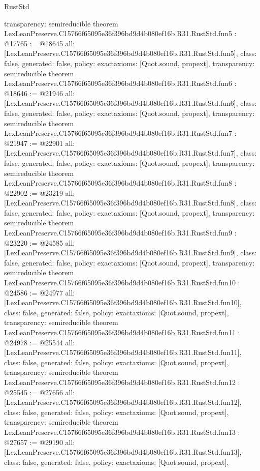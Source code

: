 \begin{lexlean}{RustStd}
\begin{coremodule}
{  transparency: semireducible
}
theorem LexLeanPreserve.C15766f65095e36f396bd9d4b080ef16b.R31.RustStd.fun5 : @17765 := @18645 {
  all: [LexLeanPreserve.C15766f65095e36f396bd9d4b080ef16b.R31.RustStd.fun5],
  class: false,
  generated: false,
  policy: exact{axioms: [Quot.sound, propext]},
  transparency: semireducible
}
theorem LexLeanPreserve.C15766f65095e36f396bd9d4b080ef16b.R31.RustStd.fun6 : @18646 := @21946 {
  all: [LexLeanPreserve.C15766f65095e36f396bd9d4b080ef16b.R31.RustStd.fun6],
  class: false,
  generated: false,
  policy: exact{axioms: [Quot.sound, propext]},
  transparency: semireducible
}
theorem LexLeanPreserve.C15766f65095e36f396bd9d4b080ef16b.R31.RustStd.fun7 : @21947 := @22901 {
  all: [LexLeanPreserve.C15766f65095e36f396bd9d4b080ef16b.R31.RustStd.fun7],
  class: false,
  generated: false,
  policy: exact{axioms: [Quot.sound, propext]},
  transparency: semireducible
}
theorem LexLeanPreserve.C15766f65095e36f396bd9d4b080ef16b.R31.RustStd.fun8 : @22902 := @23219 {
  all: [LexLeanPreserve.C15766f65095e36f396bd9d4b080ef16b.R31.RustStd.fun8],
  class: false,
  generated: false,
  policy: exact{axioms: [Quot.sound, propext]},
  transparency: semireducible
}
theorem LexLeanPreserve.C15766f65095e36f396bd9d4b080ef16b.R31.RustStd.fun9 : @23220 := @24585 {
  all: [LexLeanPreserve.C15766f65095e36f396bd9d4b080ef16b.R31.RustStd.fun9],
  class: false,
  generated: false,
  policy: exact{axioms: [Quot.sound, propext]},
  transparency: semireducible
}
theorem LexLeanPreserve.C15766f65095e36f396bd9d4b080ef16b.R31.RustStd.fun10 : @24586 := @24977 {
  all: [LexLeanPreserve.C15766f65095e36f396bd9d4b080ef16b.R31.RustStd.fun10],
  class: false,
  generated: false,
  policy: exact{axioms: [Quot.sound, propext]},
  transparency: semireducible
}
theorem LexLeanPreserve.C15766f65095e36f396bd9d4b080ef16b.R31.RustStd.fun11 : @24978 := @25544 {
  all: [LexLeanPreserve.C15766f65095e36f396bd9d4b080ef16b.R31.RustStd.fun11],
  class: false,
  generated: false,
  policy: exact{axioms: [Quot.sound, propext]},
  transparency: semireducible
}
theorem LexLeanPreserve.C15766f65095e36f396bd9d4b080ef16b.R31.RustStd.fun12 : @25545 := @27656 {
  all: [LexLeanPreserve.C15766f65095e36f396bd9d4b080ef16b.R31.RustStd.fun12],
  class: false,
  generated: false,
  policy: exact{axioms: [Quot.sound, propext]},
  transparency: semireducible
}
theorem LexLeanPreserve.C15766f65095e36f396bd9d4b080ef16b.R31.RustStd.fun13 : @27657 := @29190 {
  all: [LexLeanPreserve.C15766f65095e36f396bd9d4b080ef16b.R31.RustStd.fun13],
  class: false,
  generated: false,
  policy: exact{axioms: [Quot.sound, propext]},
}
\end{coremodule}
\end{lexlean}
